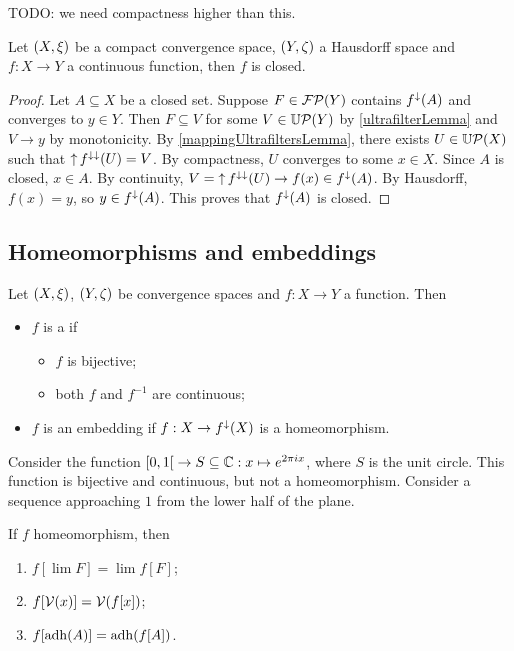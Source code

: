 TODO: we need compactness higher than this.
\begin{lemma}
Let $\sSet{X,\xi}$ be a compact convergence space, $\sSet{Y,\zeta}$ a Hausdorff space and $f: X\to Y$ a continuous function, then $f$ is closed.
\end{lemma}
\begin{proof}
Let $A\subseteq X$ be a closed set. Suppose $F\in\operatorname{\mathcal{FP}}(Y)$ contains $f^\downarrow(A)$ and converges to $y\in Y$. Then $F\subseteq V$ for some $V\in\operatorname{\mathbb{U}\mathcal{P}}(Y)$ by \ref{ultrafilterLemma} and $V\to y$ by monotonicity. By \ref{mappingUltrafiltersLemma}, there exists $U\in \operatorname{\mathbb{U}\mathcal{P}}(X)$ such that $\operatorname{\uparrow} f^{\downarrow\downarrow}(U) = V$. By compactness, $U$ converges to some $x\in X$. Since $A$ is closed, $x\in A$. By continuity, $V = \operatorname{\uparrow} f^{\downarrow\downarrow}(U) \to f(x)\in f^\downarrow(A)$. By Hausdorff, $f(x) = y$, so $y\in f^\downarrow(A)$. This proves that $f^\downarrow(A)$ is closed.
\end{proof}

\subsection{Homeomorphisms and embeddings}
\begin{definition}
Let $\sSet{X,\xi}$, $\sSet{Y,\zeta}$ be convergence spaces and $f: X\to Y$ a function. Then
\begin{itemize}
\item $f$ is a  if
\begin{itemize}
\item $f$ is bijective;
\item both $f$ and $f^{-1}$ are continuous;
\end{itemize}
\item $f$ is an embedding if $f: X\to f^\downarrow(X)$ is a homeomorphism.
\end{itemize}
\end{definition}

\begin{example}
Consider the function $\interval[co]{0,1} \to S\subseteq\C: x\mapsto e^{2\pi i x}$, where $S$ is the unit circle. This function is bijective and continuous, but not a homeomorphism. Consider a sequence approaching $1$ from the lower half of the plane.
\end{example}

\begin{proposition} \label{homeomorphismPreservation}
If $f$ homeomorphism, then
\begin{enumerate}
\item $f[\lim F] = \lim f[F]$;
\item $f[\operatorname{\mathcal{V}}(x)] = \operatorname{\mathcal{V}}(f[x])$;
\item $f[\operatorname{adh}(A)] = \operatorname{adh}(f[A])$.
\end{enumerate}
\end{proposition}


